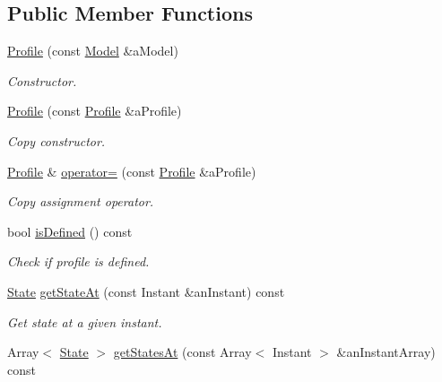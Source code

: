 \subsection*{Public Member Functions}
\begin{DoxyCompactItemize}
\item 
\hyperlink{classostk_1_1astro_1_1flight_1_1_profile_a09d523b4a58db0d8cc082b4a4d1418a7}{Profile} (const \hyperlink{classostk_1_1astro_1_1flight_1_1profile_1_1_model}{Model} \&a\+Model)
\begin{DoxyCompactList}\small\item\em Constructor. \end{DoxyCompactList}\item 
\hyperlink{classostk_1_1astro_1_1flight_1_1_profile_a67dc07f205bb3c49c5da9f2013f81f40}{Profile} (const \hyperlink{classostk_1_1astro_1_1flight_1_1_profile}{Profile} \&a\+Profile)
\begin{DoxyCompactList}\small\item\em Copy constructor. \end{DoxyCompactList}\item 
\hyperlink{classostk_1_1astro_1_1flight_1_1_profile}{Profile} \& \hyperlink{classostk_1_1astro_1_1flight_1_1_profile_a81696f834f8d29cf107edad1963e5c00}{operator=} (const \hyperlink{classostk_1_1astro_1_1flight_1_1_profile}{Profile} \&a\+Profile)
\begin{DoxyCompactList}\small\item\em Copy assignment operator. \end{DoxyCompactList}\item 
bool \hyperlink{classostk_1_1astro_1_1flight_1_1_profile_ad29d08d46698fae962e74105f16985a4}{is\+Defined} () const
\begin{DoxyCompactList}\small\item\em Check if profile is defined. \end{DoxyCompactList}\item 
\hyperlink{classostk_1_1astro_1_1flight_1_1profile_1_1_state}{State} \hyperlink{classostk_1_1astro_1_1flight_1_1_profile_a086758b767464ee2dc06cfda71fa3d48}{get\+State\+At} (const Instant \&an\+Instant) const
\begin{DoxyCompactList}\small\item\em Get state at a given instant. \end{DoxyCompactList}\item 
Array$<$ \hyperlink{classostk_1_1astro_1_1flight_1_1profile_1_1_state}{State} $>$ \hyperlink{classostk_1_1astro_1_1flight_1_1_profile_af35830c9e26ca7fffcc6e7e3ce86e9b2}{get\+States\+At} (const Array$<$ Instant $>$ \&an\+Instant\+Array) const

\end{DoxyCompactItemize}
